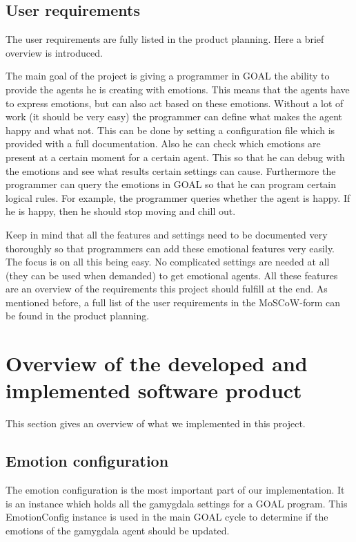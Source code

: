 \documentclass[11pt]{article}
\begin{document}
\subsection{User requirements}
The user requirements are fully listed in the product planning. Here a brief overview is introduced.\par
The main goal of the project is giving a programmer in GOAL the ability to provide the agents he is creating with emotions. This means that the agents have to express emotions, but can also act based on these emotions. Without a lot of work (it should be very easy) the programmer can define what makes the agent happy and what not. This can be done by setting a configuration file which is provided with a full documentation. Also he can check which emotions are present at a certain moment for a certain agent. This so that he can debug with the emotions and see what results certain settings can cause. Furthermore the programmer can query the emotions in GOAL so that he can program certain logical rules. For example, the programmer queries whether the agent is happy. If he is happy, then he should stop moving and chill out.\par Keep in mind that all the features and settings need to be documented very thoroughly so that programmers can add these emotional features very easily. The focus is on all this being easy. No complicated settings are needed at all (they can be used when demanded) to get emotional agents. All these features are an overview of the requirements this project should fulfill at the end. As mentioned before, a full list of the user requirements in the MoSCoW-form can be found in the product planning.

\section{Overview of the developed and implemented software product}
This section gives an overview of what we implemented in this project. 

\subsection{Emotion configuration}
The emotion configuration is the most important part of our implementation. It is an instance which holds all the gamygdala settings for a GOAL program. This EmotionConfig instance is used in the main GOAL cycle to determine if the emotions of the gamygdala agent should be updated.
\end{document}
